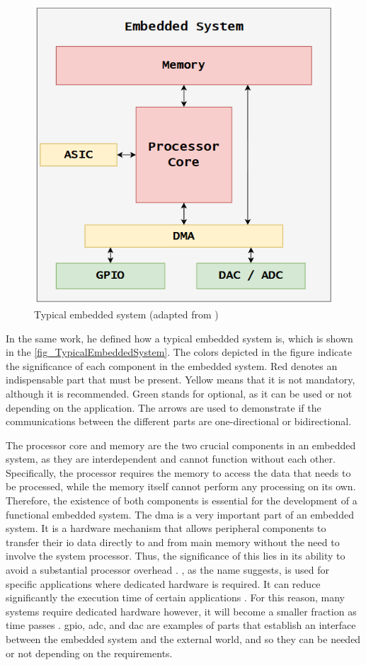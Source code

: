 \begin{figure}[H]
	\centering
 	\includegraphics[width=0.6\linewidth]{Images/TypicalEmbeddedSystem.png}
 	\caption{Typical embedded system (adapted from \cite{camposano1996embedded})}
	 \label{fig_TypicalEmbeddedSystem}
\end{figure}

In the same work, he defined how a typical embedded system is, which is shown in the \autoref{fig_TypicalEmbeddedSystem}. The colors depicted in the figure indicate the significance of each component in the embedded system. Red denotes an indispensable part that must be present. Yellow means that it is not mandatory, although it is recommended. Green stands for optional, as it can be used or not depending on the application. The arrows are used to demonstrate if the communications between the different parts are one-directional or bidirectional. 

The processor core and memory are the two crucial components in an embedded system, as they are interdependent and cannot function without each other. Specifically, the processor requires the memory to access the data that needs to be processed, while the memory itself cannot perform any processing on its own. Therefore, the existence of both components is essential for the development of a functional embedded system. The \gls{dma} is a very important part of an embedded system. It is a hardware mechanism that allows peripheral components to transfer their \gls{io} data directly to and from main memory without the need to involve the system processor. Thus, the significance of this lies in its ability to avoid a substantial processor overhead \cite{LinuxDeviceDrivers}. , as the name suggests, is used for specific applications where dedicated hardware is required. It can reduce significantly the execution time of certain applications \cite{FPGAaccelaration3} \cite{FPGAaccelaration2} \cite{FPGAaccelaration}. For this reason, many systems require dedicated hardware however, it will become a smaller fraction as time passes \cite{camposano1996embedded}. \gls{gpio}, \gls{adc}, and \gls{dac} are examples of parts that establish an interface between the embedded system and the external world, and so they can be needed or not depending on the requirements.

